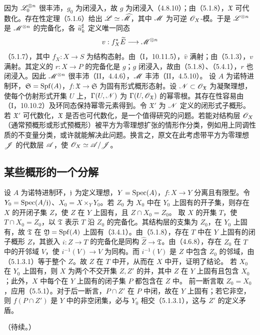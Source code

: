 因为 $\mathscr L_0^{\otimes n}$ 很丰沛，$g_0$ 为闭浸入，故 $g$ 为闭浸入（4.8.10）；由（5.1.8），$\mathfrak X$ 可代数化。存在性定理（5.1.6）给出 $\mathscr L\simeq\widehat{\mathscr M}$，其中 $\mathscr M$ 为可逆 $\mathscr O_X$-模。于是 $\mathscr L^{\otimes n}$ 是 $\mathscr M^{\otimes n}$ 的完备化，各 $\widetilde{u}_k^\sharp$ 定义唯一同态
\[
v:f_X^*\widetilde{E}\longrightarrow\mathscr M^{\otimes n}
\]
（5.1.7），其中 $f_X:X\to S$ 为结构态射。由（I，10.11.5），$\widehat v$ 满射；由（5.1.3），$v$ 满射。其定义的 $r:X\to P$ 的完备化是 $g$；$g$ 闭浸入，故由（5.1.8）、（5.4.1），$r$ 也闭浸入。因此 $\mathscr M^{\otimes n}$ 很丰沛（II，4.4.6），$\mathscr M$ 丰沛（II，4.5.10）。\finishproof
{}
设 $A$ 为诺特进制环，$\mathfrak S=\operatorname{Spf}(A)$，$f:\mathfrak X\to\mathfrak S$ 为固有形式概形态射。设 $\mathscr N\subset\mathscr O_{\mathfrak X}$ 为凝聚理想，使每个仿射形式开集 $U$ 上，$\Gamma(U,\mathscr N)$ 为 $\Gamma(U,\mathscr O_{\mathfrak X})$ 的幂零根。其存在性容易由（I，10.10.2）及环同态保持幂零元素得到。令 $\mathfrak X'$ 为 $\mathscr N$ 定义的闭形式子概形。若 $\mathfrak X'$ 可代数化，$\mathfrak X$ 是否也可代数化，是一个值得研究的问题。若能对结构层 $\mathscr O_X$（通常预概形或形式预概形）被平方为零理想扩张的情形作分类，例如用上同调性质的不变量分类，或许就能解决此问题。换言之，原文在此考虑带平方为零理想 $\mathscr J$ 的代数层 $\mathscr A$，使 $\mathscr O_X\simeq\mathscr A/\mathscr J$。

\subsection{某些概形的一个分解}
设 $A$ 为诺特进制环，$\mathfrak j$ 为定义理想，$Y=\operatorname{Spec}(A)$，$f:X\to Y$ 分离且有限型。令 $Y_0=\operatorname{Spec}(A/\mathfrak j)$、$X_0=X\times_YY_0$。若 $Z_0$ 为 $X_0$ 中在 $Y_0$ 上固有的开子集，则存在 $X$ 的开闭子集 $Z$，使 $Z$ 在 $Y$ 上固有，且 $Z\cap X_0=Z_0$。
\eproof
取 $X$ 的开集 $T$，使 $T\cap X_0=Z_0$，以 $\mathfrak T$ 表示 $T$ 沿 $Z_0$ 的完备化。其结构层的支集为 $Z_0$，在 $Y_0$ 上固有，故 $\mathfrak T$ 在 $\mathfrak Y=\operatorname{Spf}(A)$ 上固有（3.4.1）。由（5.1.8），存在 $T$ 中在 $Y$ 上固有的闭子概形 $Z$，其嵌入 $i:Z\to T$ 的完备化是同构 $\widehat Z\to\mathfrak T$。由（4.6.8），存在 $Z_0$ 在 $T$ 中的开邻域 $V$，使 $i^{-1}(V)\to V$ 为同构。而 $i^{-1}(V)$ 是 $Z$ 中包含 $Z_0$ 的邻域，由（5.1.3.1）等于整个 $Z$。故 $Z$ 在 $T$ 中开，从而在 $X$ 中开，证明了结论。\finishproof
{}
若 $X_0$ 在 $Y_0$ 上固有，则 $X$ 为两个不交开集 $Z,Z'$ 的并，其中 $Z$ 在 $Y$ 上固有且包含 $X_0$；此外，$X$ 中每个在 $Y$ 上固有的闭子集 $P$ 都包含在 $Z$ 中。
\eproof
前一断言取 $Z_0=X_0$，应用（5.5.1）。对于后一断言，$P\cap Z'$ 在 $P$ 中闭，故在 $Y$ 上固有；若它非空，则 $f(P\cap Z')$ 是 $Y$ 中的非空闭集，必与 $Y_0$ 相交（5.1.3.1），这与 $Z'$ 的定义矛盾。\finishproof
\begin{flushright}（待续。）\end{flushright}\par


